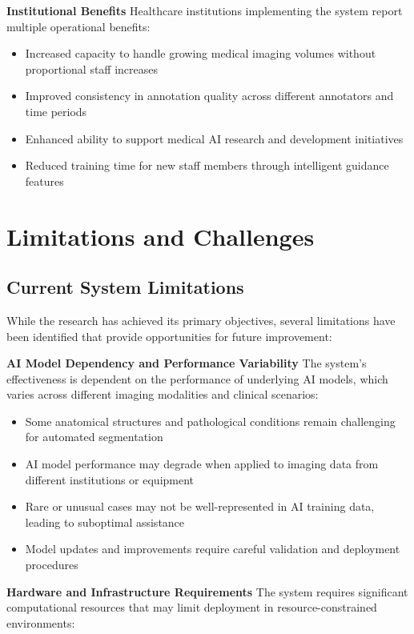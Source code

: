 \textbf{Institutional Benefits}
Healthcare institutions implementing the system report multiple operational benefits:
\begin{itemize}
    \item Increased capacity to handle growing medical imaging volumes without proportional staff increases
    \item Improved consistency in annotation quality across different annotators and time periods
    \item Enhanced ability to support medical AI research and development initiatives
    \item Reduced training time for new staff members through intelligent guidance features
\end{itemize}

\section{Limitations and Challenges}

\subsection{Current System Limitations}

While the research has achieved its primary objectives, several limitations have been identified that provide opportunities for future improvement:

\textbf{AI Model Dependency and Performance Variability}
The system's effectiveness is dependent on the performance of underlying AI models, which varies across different imaging modalities and clinical scenarios:

\begin{itemize}
    \item Some anatomical structures and pathological conditions remain challenging for automated segmentation
    \item AI model performance may degrade when applied to imaging data from different institutions or equipment
    \item Rare or unusual cases may not be well-represented in AI training data, leading to suboptimal assistance
    \item Model updates and improvements require careful validation and deployment procedures
\end{itemize}

\textbf{Hardware and Infrastructure Requirements}
The system requires significant computational resources that may limit deployment in resource-constrained environments:

